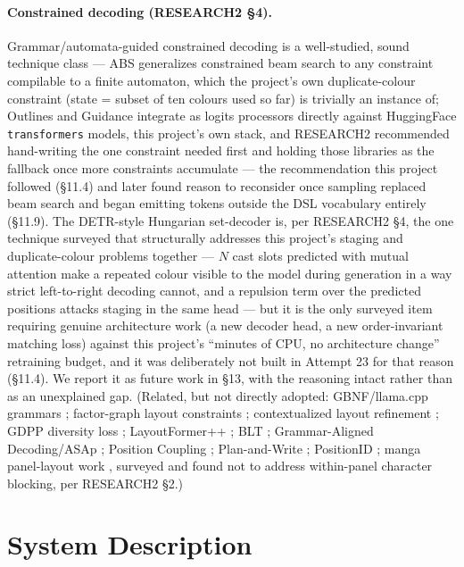 \documentclass[11pt]{article}
\newcommand{\secsym}{\S}
\begin{document}
\paragraph{Constrained decoding (RESEARCH2 \secsym4).}
Grammar/automata-guided constrained decoding is a well-studied, sound
technique class --- ABS \cite{abs2025} generalizes constrained beam search
to any constraint compilable to a finite automaton, which the project's
own duplicate-colour constraint (state = subset of ten colours used so
far) is trivially an instance of; Outlines \cite{outlines} and Guidance
\cite{guidance} integrate as logits processors directly against
HuggingFace \texttt{transformers} models, this project's own stack, and
RESEARCH2 recommended hand-writing the one constraint needed first and
holding those libraries as the fallback once more constraints accumulate
--- the recommendation this project followed (\secsym11.4) and later found
reason to reconsider once sampling replaced beam search and began emitting
tokens outside the DSL vocabulary entirely (\secsym11.9). The DETR-style
Hungarian set-decoder \cite{carion2020detr} is, per RESEARCH2 \secsym4,
the one technique surveyed that structurally addresses this project's
staging and duplicate-colour problems together --- $N$ cast slots
predicted with mutual attention make a repeated colour visible to the
model during generation in a way strict left-to-right decoding cannot, and
a repulsion term over the predicted positions attacks staging in the same
head --- but it is the only surveyed item requiring genuine architecture
work (a new decoder head, a new order-invariant matching loss) against
this project's ``minutes of CPU, no architecture change'' retraining
budget, and it was deliberately not built in Attempt 23 for that reason
(\secsym11.4). We report it as future work in \secsym13, with the
reasoning intact rather than as an unexplained gap. (Related, but not
directly adopted: GBNF/llama.cpp grammars \cite{llamacppgbnf}; factor-graph
layout constraints \cite{factorgraphs2024}; contextualized layout
refinement \cite{zhao2020scenegraphlayout}; GDPP diversity loss
\cite{elfeki2019gdpp}; LayoutFormer++ \cite{jiang2023layoutformerpp}; BLT
\cite{kong2022blt}; Grammar-Aligned Decoding/ASAp \cite{park2024asap};
Position Coupling \cite{cho2024positioncoupling}; Plan-and-Write
\cite{planandwrite2025}; PositionID \cite{positionid2024}; manga
panel-layout work \cite{mangapanel2024,comicsurvey2024}, surveyed and
found not to address within-panel character blocking, per RESEARCH2
\secsym2.)

\section{System Description}
\label{sec:system}
\end{document}
